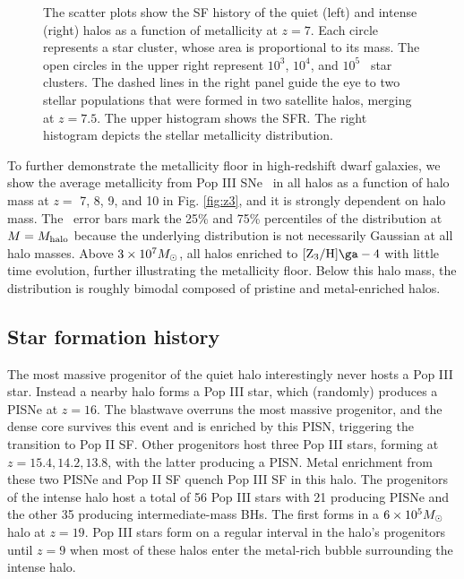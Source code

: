 \documentclass[12pt,preprint]{aastex}
\begin{document}

\begin{figure*}
\caption{\label{fig:pops} The scatter plots show the SF history of the
  quiet (left) and intense (right) halos as a function of metallicity
  at $z=7$.  Each circle represents a star cluster, whose area is
  proportional to its mass.  The open circles in the upper right
  represent $10^3$, $10^4$, and $10^5$ \Ms~star clusters.  The dashed
  lines in the right panel guide the eye to two stellar populations
  that were formed in two satellite halos, merging at $z=7.5$.  The
  upper histogram shows the SFR.  The right histogram depicts the
  stellar metallicity distribution.}
\end{figure*}


To further demonstrate the metallicity floor in high-redshift dwarf
galaxies, we show the average metallicity from Pop III SNe \zthree~in
all halos as a function of halo mass at $z =$ 7, 8, 9, and 10 in
Fig. \ref{fig:z3}, and it is strongly dependent on halo mass.  The
\zthree~error bars mark the 25\% and 75\% percentiles of the
distribution at $M = M_{\rm halo}$ because the underlying distribution
is not necessarily Gaussian at all halo masses.  Above $3 \times 10^7
\Ms$, all halos enriched to $\zthree \ga -4$ with little time
evolution, further illustrating the metallicity floor.  Below this
halo mass, the distribution is roughly bimodal composed of pristine
and metal-enriched halos.

\subsection{Star formation history}
\label{sec:pop}

The most massive progenitor of the quiet halo interestingly never
hosts a Pop III star.  Instead a nearby halo forms a Pop III star,
which (randomly) produces a PISNe at $z=16$.  The blastwave overruns
the most massive progenitor, and the dense core survives this event
and is enriched by this PISN, triggering the transition to Pop II SF.
Other progenitors host three Pop III stars, forming at $z = 15.4,
14.2, 13.8$, with the latter producing a PISN.  Metal enrichment from
these two PISNe and Pop II SF quench Pop III SF in this halo.  The
progenitors of the intense halo host a total of 56 Pop III stars with
21 producing PISNe and the other 35 producing intermediate-mass BHs.
The first forms in a $6 \times 10^5 \Ms$ halo at $z=19$.  Pop III
stars form on a regular interval in the halo's progenitors until $z=9$
when most of these halos enter the metal-rich bubble surrounding the
intense halo.
\end{document}
